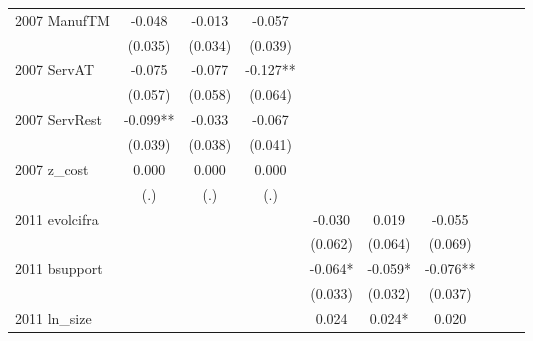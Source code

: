 \begin{table}[htbp]
\begin{tabular}{l*{9}{c}}
2007 ManufTM        &      -0.048   &      -0.013   &      -0.057   &               &               &               &               &               &               \\
                    &     (0.035)   &     (0.034)   &     (0.039)   &               &               &               &               &               &               \\
2007 ServAT         &      -0.075   &      -0.077   &      -0.127** &               &               &               &               &               &               \\
                    &     (0.057)   &     (0.058)   &     (0.064)   &               &               &               &               &               &               \\
2007 ServRest       &      -0.099** &      -0.033   &      -0.067   &               &               &               &               &               &               \\
                    &     (0.039)   &     (0.038)   &     (0.041)   &               &               &               &               &               &               \\
2007 z\_cost         &       0.000   &       0.000   &       0.000   &               &               &               &               &               &               \\
                    &         (.)   &         (.)   &         (.)   &               &               &               &               &               &               \\
2011 evolcifra      &               &               &               &      -0.030   &       0.019   &      -0.055   &               &               &               \\
                    &               &               &               &     (0.062)   &     (0.064)   &     (0.069)   &               &               &               \\
2011 bsupport       &               &               &               &      -0.064*  &      -0.059*  &      -0.076** &               &               &               \\
                    &               &               &               &     (0.033)   &     (0.032)   &     (0.037)   &               &               &               \\
2011 ln\_size        &               &               &               &       0.024   &       0.024*  &       0.020   &               &               &               \\

\end{tabular}
\end{table}
